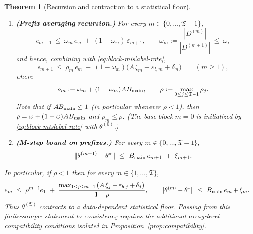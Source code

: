\documentclass{statsoc}
\newtheorem{theorem}{Theorem}[section]
\newcommand{\1}{\mathbbm{1}}
\newcommand{\Tmax}{\mathfrak{T}}
\begin{document}
\begin{theorem}[Recursion and contraction to a statistical floor]
\begin{enumerate}[nosep,label=(\roman*)]
\item \textbf{(Prefix averaging recursion.)} For every $m\in\{0,\dots,\Tmax-1\}$,
\begin{equation}\label{eq:prefix-avg-rec}
e_{m+1}
\ \le\ \omega_m\,e_m\ +\ (1-\omega_m)\,\varepsilon_{m+1},
\qquad
\omega_m:=\frac{|D^{(m)}|}{|D^{(m+1)}|}\ \le\ \omega,
\end{equation}
and hence, combining with \eqref{eq:block-mislabel-rate},
\begin{equation}\label{eq:e-recursion}
e_{m+1}
\ \le\ \rho_m\,e_m\ +\ (1-\omega_m)\big(A\,\xi_m+\varepsilon_{b,m}+\delta_m\big)
\qquad(m\ge 1),
\end{equation}
where
\[
\rho_m:=\omega_m+(1-\omega_m)AB_{\rm main},
\qquad
\rho:=\max_{0\le j\le \Tmax-1}\rho_j.
\]
Note that if $AB_{\rm main}\le 1$ (in particular whenever $\rho<1$), then $\rho=\omega+(1-\omega)AB_{\rm main}$ and $\rho_m\le\rho$. (The base block $m=0$ is initialized by \eqref{eq:block-mislabel-rate} with $\theta^{(0)}$.)

\item \textbf{(M-step bound on prefixes.)} For every $m\in\{0,\dots,\Tmax-1\}$,
\begin{equation}\label{eq:theta-from-e}
\|\theta^{(m+1)}-\theta^\star\|
\ \le\ B_{\rm main}\,e_{m+1}\ +\ \xi_{m+1}.
\end{equation}
\end{enumerate}

In particular, if $\rho<1$ then for every $m\in\{1,\dots,\Tmax\}$,
\[
e_m\ \le\ \rho^{m-1}e_1\ +\ \frac{\max_{1\le j\le m-1}\big(A\,\xi_j+\varepsilon_{b,j}+\delta_j\big)}{1-\rho},
\qquad
\|\theta^{(m)}-\theta^\star\|\ \le\ B_{\rm main}\,e_m+\xi_m.
\]
Thus \(\theta^{(\Tmax)}\) contracts to a data-dependent statistical floor. Passing from this finite-sample statement to consistency requires the additional array-level compatibility conditions isolated in Proposition~\ref{prop:compatibility}.
\end{theorem}
\end{document}

